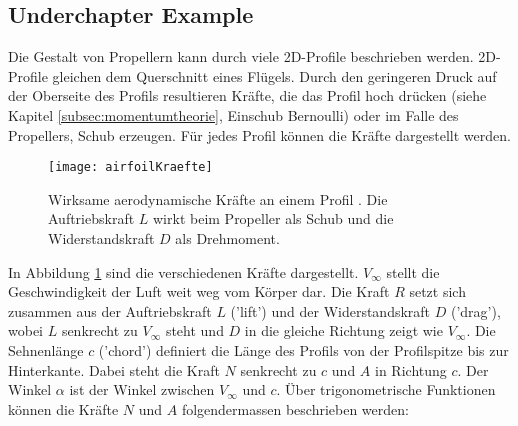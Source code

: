 \subsection{Underchapter Example}
\label{subsec:underchapterexample}

Die Gestalt von Propellern kann durch viele 2D-Profile beschrieben werden. 2D-Profile gleichen dem Querschnitt eines Flügels. Durch den geringeren Druck auf der Oberseite des Profils resultieren Kräfte, die das Profil hoch drücken (siehe Kapitel \ref{subsec:momentumtheorie}, Einschub Bernoulli) oder im Falle des Propellers, Schub erzeugen. Für jedes Profil können die Kräfte dargestellt werden.

\vspace{0.05cm}

\begin{figure}[htb!]
\begin{center}
\texttt{[image: airfoilKraefte]}
\caption[Wirksame aerodynamische Kräfte an einem Profil]{Wirksame aerodynamische Kräfte an einem Profil \cite{aeroKraefte}. Die Auftriebskraft $L$ wirkt beim Propeller als Schub und die Widerstandskraft $D$ als Drehmoment.}
\label{fig:airfoilKraefte}
\end{center}
\end{figure}

\vspace{0.05cm}

In Abbildung \ref{fig:airfoilKraefte} sind die verschiedenen Kräfte dargestellt. $V_\infty$ stellt die Geschwindigkeit der Luft weit weg vom Körper dar. Die Kraft $R$ setzt sich zusammen aus der Auftriebskraft $L$ ('lift') und der Widerstandskraft $D$ ('drag'), wobei $L$ senkrecht zu $V_\infty$ steht und $D$ in die gleiche Richtung zeigt wie $V_\infty$.
Die Sehnenlänge $c$ ('chord') definiert die Länge des Profils von der Profilspitze bis zur Hinterkante. Dabei steht die Kraft $N$ senkrecht zu $c$ und $A$ in Richtung $c$. Der Winkel $\alpha$ ist der Winkel zwischen $V_\infty$ und $c$.
Über trigonometrische Funktionen können die Kräfte $N$ und $A$ folgendermassen beschrieben werden:

